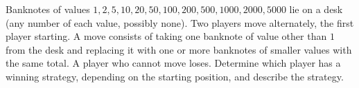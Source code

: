 Banknotes of values $1,2,5,10,20,50,100,200,500,1000,2000,5000$ lie on a desk (any number of each value, possibly none). Two players move alternately, the first player starting. A move consists of taking one banknote of value other than $1$ from the desk and replacing it with one or more banknotes of smaller values with the same total. A player who cannot move loses. Determine which player has a winning strategy, depending on the starting position, and describe the strategy.
